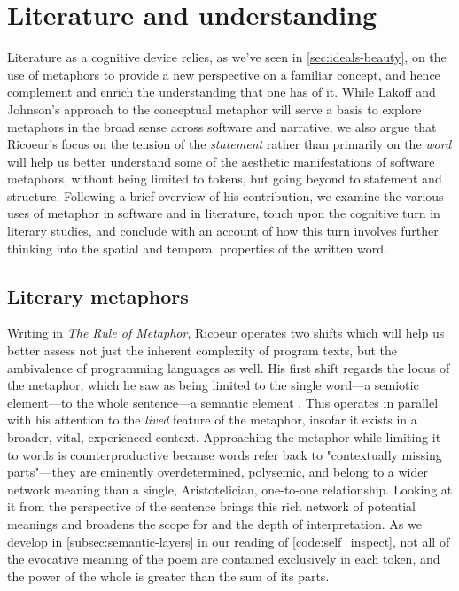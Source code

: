 \section{Literature and understanding}
\label{sec:aesthetic-literature}

Literature as a cognitive device relies, as we've seen in \ref{sec:ideals-beauty}, on the use of metaphors to provide a new perspective on a familiar concept, and hence complement and enrich the understanding that one has of it. While Lakoff and Johnson's approach to the conceptual metaphor will serve a basis to explore metaphors in the broad sense across software and narrative, we also argue that Ricoeur's focus on the tension of the \emph{statement} rather than primarily on the \emph{word} will help us better understand some of the aesthetic manifestations of software metaphors, without being limited to tokens, but going beyond to statement and structure. Following a brief overview of his contribution, we examine the various uses of metaphor in software and in literature, touch upon the cognitive turn in literary studies, and conclude with an account of how this turn involves further thinking into the spatial and temporal properties of the written word.

\subsection{Literary metaphors}
\label{subsec:literary-metaphors}

Writing in \emph{The Rule of Metaphor}, Ricoeur operates two shifts which will help us better assess not just the inherent complexity of program texts, but the ambivalence of programming languages as well. His first shift regards the locus of the metaphor, which he saw as being limited to the single word—a semiotic element—to the whole sentence—a semantic element \citep{ricoeur_rule_2003}. This operates in parallel with his attention to the \emph{lived} feature of the metaphor, insofar it exists in a broader, vital, experienced context. Approaching the metaphor while limiting it to words is counterproductive because words refer back to "contextually missing parts"—they are eminently overdetermined, polysemic, and belong to a wider network meaning than a single, Aristotelician, one-to-one relationship. Looking at it from the perspective of the sentence brings this rich network of potential meanings and broadens the scope for and the depth of interpretation. As we develop in \ref{subsec:semantic-layers} in our reading of \ref{code:self_inspect}, not all of the evocative meaning of the poem are contained exclusively in each token, and the power of the whole is greater than the sum of its parts.

